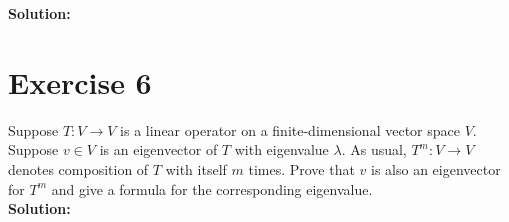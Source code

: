 \documentclass{article}
\begin{document}
\textbf{Solution:} \\



\newpage

\section*{Exercise 6}
Suppose $T : V \rightarrow V$ is a linear operator on a finite-dimensional vector space $V$. Suppose $v \in V$ is an eigenvector of $T$ with eigenvalue $\lambda$. As usual, $T^m : V \rightarrow V$ denotes composition of $T$ with itself $m$ times. Prove that $v$ is also an eigenvector for $T^m$ and give a formula for the corresponding eigenvalue. \\

\textbf{Solution:} \\



\newpage
\end{document}
